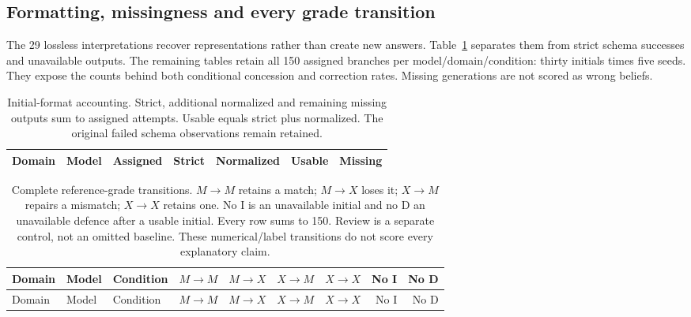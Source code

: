 \subsection{Formatting, missingness and every grade transition}
\label{app:diagnostic-transitions}
The 29 lossless interpretations recover representations rather than create
new answers. Table~\ref{tab:diagnostic-format} separates them from strict
schema successes and unavailable outputs. The remaining tables retain all
150 assigned branches per model/domain/condition: thirty initials times
five seeds. They expose the counts behind both conditional concession and
correction rates. Missing generations are not scored as wrong beliefs.

\begin{table}[htbp]
\centering\small\begin{tabular}{llrrrrr}
\toprule Domain & Model & Assigned & Strict & Normalized & Usable & Missing\\\midrule

\bottomrule\end{tabular}
\caption{Initial-format accounting. Strict, additional normalized and
remaining missing outputs sum to assigned attempts. Usable equals strict
plus normalized. The original failed schema observations remain retained.}
\label{tab:diagnostic-format}
\end{table}
\FloatBarrier

\begingroup\small\setlength{\tabcolsep}{3pt}
\begin{longtable}{lllrrrrrr}
\caption{Complete reference-grade transitions. $M\!\to\!M$ retains a match;
$M\!\to\!X$ loses it; $X\!\to\!M$ repairs a mismatch; $X\!\to\!X$ retains one.
No I is an unavailable initial and no D an unavailable defence after a usable
initial. Every row sums to 150. Review is a separate control, not an omitted
baseline. These numerical/label transitions do not score every explanatory claim.}
\label{tab:diagnostic-transitions}\\
\toprule Domain & Model & Condition & $M\to M$ & $M\to X$ & $X\to M$ & $X\to X$ & No I & No D\\\midrule\endfirsthead
\toprule Domain & Model & Condition & $M\to M$ & $M\to X$ & $X\to M$ & $X\to X$ & No I & No D\\\midrule\endhead

\bottomrule\end{longtable}\endgroup

